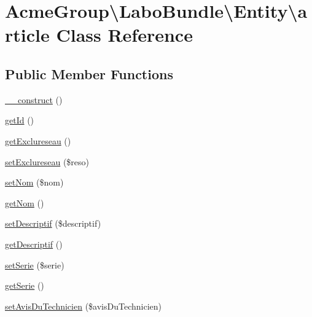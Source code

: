 \hypertarget{class_acme_group_1_1_labo_bundle_1_1_entity_1_1article}{\section{Acme\+Group\textbackslash{}Labo\+Bundle\textbackslash{}Entity\textbackslash{}article Class Reference}
\label{class_acme_group_1_1_labo_bundle_1_1_entity_1_1article}
}
\subsection*{Public Member Functions}
\begin{DoxyCompactItemize}
\item 
\hyperlink{class_acme_group_1_1_labo_bundle_1_1_entity_1_1article_a2c23b2a83bedec3b693c8d228899a21d}{\+\_\+\+\_\+construct} ()
\item 
\hyperlink{class_acme_group_1_1_labo_bundle_1_1_entity_1_1article_a52248577a3e58a85bb7f66170f4c7477}{get\+Id} ()
\item 
\hyperlink{class_acme_group_1_1_labo_bundle_1_1_entity_1_1article_a77ec8917f621389b32935ca5aeee85f5}{get\+Exclureseau} ()
\item 
\hyperlink{class_acme_group_1_1_labo_bundle_1_1_entity_1_1article_adfc97c5c23320c82a3884c2361218e8a}{set\+Exclureseau} (\$reso)
\item 
\hyperlink{class_acme_group_1_1_labo_bundle_1_1_entity_1_1article_ae3c4d6f8ec1f04811dc3da0e5698078f}{set\+Nom} (\$nom)
\item 
\hyperlink{class_acme_group_1_1_labo_bundle_1_1_entity_1_1article_abe694e1268554fc67b907087bcca37b0}{get\+Nom} ()
\item 
\hyperlink{class_acme_group_1_1_labo_bundle_1_1_entity_1_1article_aa411ef7a93b67eeb476a5af631c85d14}{set\+Descriptif} (\$descriptif)
\item 
\hyperlink{class_acme_group_1_1_labo_bundle_1_1_entity_1_1article_a76ee0d91021f5475a4e2b47880984777}{get\+Descriptif} ()
\item 
\hyperlink{class_acme_group_1_1_labo_bundle_1_1_entity_1_1article_aebabfe833b7ae41178036da5810e818c}{set\+Serie} (\$serie)
\item 
\hyperlink{class_acme_group_1_1_labo_bundle_1_1_entity_1_1article_a426088bfa4d4bb2551dc43e5dd898db1}{get\+Serie} ()
\item 
\hyperlink{class_acme_group_1_1_labo_bundle_1_1_entity_1_1article_aec3664e196f62b123a0bd747891f2ad9}{set\+Avis\+Du\+Technicien} (\$avis\+Du\+Technicien)

\end{DoxyCompactItemize}
